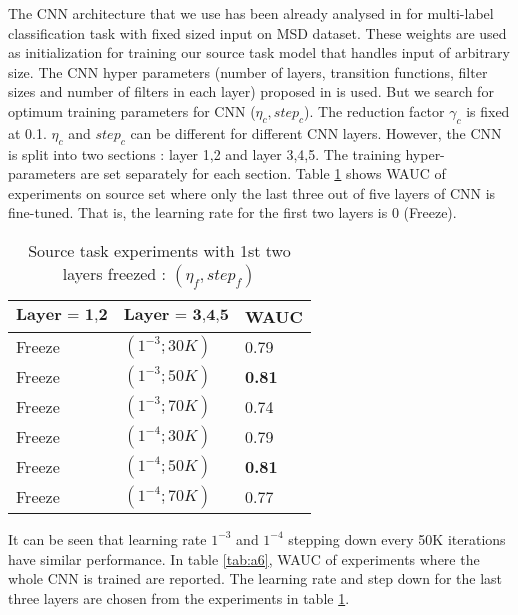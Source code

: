 \noindent The CNN architecture that we use has been already analysed in \cite{choi_cnn} for multi-label classification task with fixed sized input on MSD dataset. These weights are used as initialization for training our source task model that handles input of arbitrary size. The CNN hyper parameters (number of layers, transition functions, filter sizes and number of filters in each layer) proposed in \cite{choi_cnn} is used. But we search for optimum training parameters for CNN ($\eta_{c}, step_{c}$). The reduction factor $\gamma_{c}$ is fixed at 0.1. $\eta_{c}$ and $step_{c}$ can be different for different CNN layers. However, the CNN is split into two sections : layer 1,2 and layer 3,4,5. The training hyper-parameters are set separately for each section. Table \ref{tab:a5} shows WAUC of experiments on source set where only the last three out of five layers of CNN is fine-tuned. That is, the learning rate for the first two layers is 0 (Freeze).    
\begin{table}[!htb]
\centering
\begin{tabular}{| p{} | p{}| p{}| }
\hline
$\textbf{Layer = 1,2}$ & $\textbf{Layer = 3,4,5}$ & \textbf{WAUC}\\
\hline
Freeze & $(1^{-3}; 30K)$ & 0.79\\
\hline
Freeze & $(1^{-3}; 50K)$ & \textbf{0.81}\\
\hline
Freeze & $(1^{-3}; 70K)$ & 0.74\\
\hline
Freeze & $(1^{-4}; 30K)$ & 0.79\\
\hline
Freeze & $(1^{-4}; 50K)$ & \textbf{0.81}\\
\hline
Freeze & $(1^{-4}; 70K)$ & 0.77\\
\hline
\end{tabular}
\caption{Source task experiments with 1st two layers freezed : $(\eta_{f}, {step}_{f})$}\label{tab:a5} 
\end{table}
\FloatBarrier
\noindent It can be seen that learning rate $1^{-3}$ and $1^{-4}$ stepping down every 50K iterations have similar performance. In table \ref{tab:a6}, WAUC of experiments where the whole CNN is trained are reported. The learning rate and step down for the last three layers are chosen from the experiments in table \ref{tab:a5}.  
